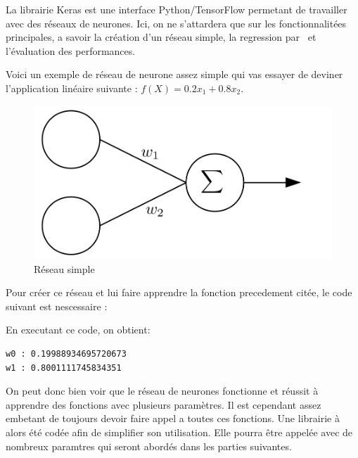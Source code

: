 La librairie Keras est une interface Python/TensorFlow\cite{tf} permetant de travailler avec des réseaux de neurones.
Ici, on ne s'attardera que sur les fonctionnalitées principales,
a savoir la création d'un réseau simple,
la regression par \sgd\ et l'évaluation des performances.


Voici un exemple de réseau de neurone assez simple
qui vas essayer de deviner l'application linéaire suivante : $f(X) = 0.2x_1 + 0.8x_2$.

\begin{figure}[H]
    \center
    \includegraphics[height=\petit]{pict/net2.png}
	\caption{Réseau simple}
	\label{fig:net2}
\end{figure}
\vspace{-12pt}


Pour créer ce réseau et lui faire apprendre la fonction precedement citée,
le code suivant est nescessaire :



En executant ce code, on obtient:
\begin{lstlisting}
w0 : 0.19988934695720673
w1 : 0.8001111745834351
\end{lstlisting}
On peut donc bien voir que le réseau de neurones fonctionne et
réussit à apprendre des fonctions avec plusieurs paramètres.
Il est cependant assez embetant de toujours devoir faire appel a toutes ces fonctions.
Une librairie à alors été codée afin de simplifier son utilisation.
Elle pourra être appelée avec de nombreux paramtres qui seront abordés dans les parties suivantes.\\
